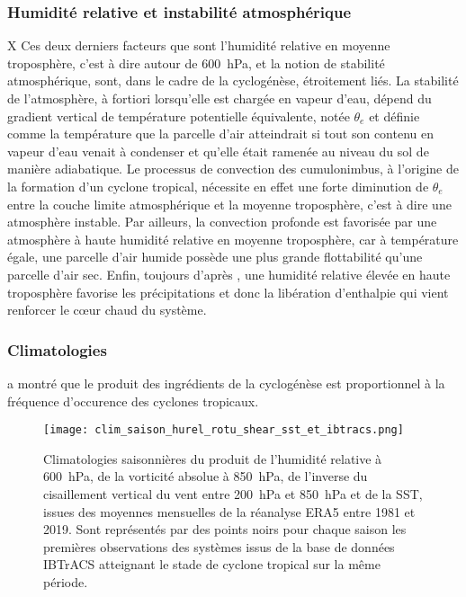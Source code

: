 \documentclass[../main.tex]{subfiles}
\begin{document}
\subsubsection{Humidité relative et instabilité atmosphérique}
X
Ces deux derniers facteurs que sont l'humidité relative en moyenne troposphère, c'est à dire autour de \SI{600}{\hecto\pascal}, et la notion de stabilité atmosphérique, sont, dans le cadre de la cyclogénèse, étroitement liés. La stabilité de l'atmosphère, à fortiori lorsqu'elle est chargée en vapeur d'eau, dépend du gradient vertical de température potentielle équivalente, notée $\theta_e$ et définie comme la température que la parcelle d'air atteindrait si tout son contenu en vapeur d'eau
venait à condenser et qu'elle était ramenée au niveau du sol de manière adiabatique. Le processus de convection des cumulonimbus, à l'origine de la formation d'un cyclone tropical, nécessite en effet une forte diminution de $\theta_e$ entre la couche limite atmosphérique et la moyenne troposphère, c'est à dire une atmosphère instable. Par ailleurs, la convection profonde est favorisée par une atmosphère à haute humidité relative en moyenne troposphère, car à température égale, une
parcelle d'air humide possède une plus grande flottabilité qu'une parcelle d'air sec. Enfin, toujours d'après \cite{gray_tropical_1975}, une humidité relative élevée en haute troposphère favorise les précipitations et donc la libération d'enthalpie qui vient renforcer le cœur chaud du système.

\subsubsection{Climatologies}

\cite{gray_tropical_1975} a montré que le produit des ingrédients de la cyclogénèse est proportionnel à la fréquence d'occurence des cyclones tropicaux.

\begin{figure}[t]
    \centering
    \texttt{[image: clim\_saison\_hurel\_rotu\_shear\_sst\_et\_ibtracs.png]}
    \caption{Climatologies saisonnières du produit de l'humidité relative à \SI{600}{\hecto\pascal}, de la vorticité absolue à \SI{850}{\hecto\pascal}, de l'inverse du cisaillement vertical du vent entre \SI{200}{\hecto\pascal} et \SI{850}{\hecto\pascal} et de la SST, issues des moyennes mensuelles de la réanalyse ERA5 entre 1981 et 2019.
Sont représentés par des points noirs pour chaque saison les premières observations des systèmes issus de la base de données IBTrACS atteignant le stade de cyclone tropical sur la même période.}
    \label{fig:ingredients_clim}
\end{figure}
\end{document}
